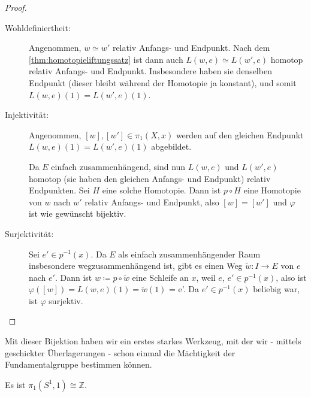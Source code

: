\begin{proof}
    \begin{description}
        \item[Wohldefiniertheit:] Angenommen, $w \simeq w'$ relativ Anfangs- und Endpunkt. Nach dem  \autoref{thm:homotopieliftungssatz} ist dann auch $L(w,e) \simeq L(w',e)$ homotop relativ Anfangs- und Endpunkt. Insbesondere haben sie denselben Endpunkt (dieser bleibt während der Homotopie ja konstant), und somit  $L(w,e)(1) = L(w',e)(1)$. 
        \item[Injektivität:] Angenommen, $[w], [w']\in \pi_1(X,x)$ werden auf den gleichen Endpunkt $L(w,e)(1) = L(w',e)(1)$ abgebildet. 

            Da $E$ einfach zusammenhängend, sind nun  $L(w,e)$ und  $L(w',e)$ homotop (sie haben den gleichen Anfangs- und Endpunkt) relativ Endpunkten. Sei $H$ eine solche Homotopie. Dann ist  $p \circ  H$ eine Homotopie von $w$ nach  $w'$ relativ Anfangs- und Endpunkt, also  $[w] = [w']$ und  $\varphi $ ist wie gewünscht bijektiv.
        \item[Surjektivität:] Sei $e' \in p^{-1} (x)$. Da $E$ als einfach zusammenhängender Raum insbesondere wegzusammenhängend ist, gibt es einen Weg  $\tilde{w}\colon I \to  E$ von $e$ nach  $e'$. Dann ist $w \coloneqq  p \circ  \tilde{w}$ eine Schleife an $x$, weil  $e$, $e' \in p^{-1} (x)$, also ist $\varphi ([w]) = L(w,e)(1) = \tilde{w}(1)$ = e'. Da $e'\in p^{-1} (x)$ beliebig war, ist $\varphi $ surjektiv.
    \end{description}
\end{proof}

\begin{oral}
    Mit dieser Bijektion haben wir ein erstes starkes Werkzeug, mit der wir - mittels geschickter Überlagerungen - schon einmal die Mächtigkeit der Fundamentalgruppe bestimmen können.
\end{oral}

\begin{theorem}\label{thm:fundamentalgruppe-von-s1-kreis}
    Es ist $\pi_1(S^1,1) \cong \mathbb{Z}$.
\end{theorem}

